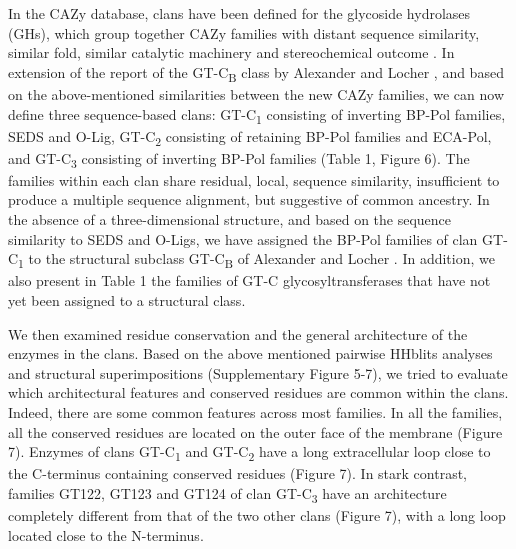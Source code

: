 \documentclass{article}
\begin{document}
In the CAZy database, clans have been defined for the glycoside hydrolases (GHs), which group together CAZy families with distant sequence similarity, similar fold, similar catalytic machinery and stereochemical outcome \cite{henrissat_updating_1996}. In extension of the report of the GT-C\textsubscript{B} class by Alexander and Locher \cite{alexander_emerging_2023}, and based on the above-mentioned similarities between the new CAZy families, we can now define three sequence-based clans: GT-C\textsubscript{1} consisting of inverting BP-Pol families, SEDS and O-Lig, GT-C\textsubscript{2} consisting of retaining BP-Pol families and ECA-Pol, and GT-C\textsubscript{3} consisting of inverting BP-Pol families (Table 1, Figure 6). The families within each clan share residual, local, sequence similarity, insufficient to produce a multiple sequence alignment, but suggestive of common ancestry. In the absence of a three-dimensional structure, and based on the sequence similarity to SEDS and O-Ligs, we have assigned the BP-Pol families of clan GT-C\textsubscript{1} to the structural subclass GT-C\textsubscript{B}  of Alexander and Locher \cite{alexander_emerging_2023}. In addition, we also present in Table 1 the families of GT-C glycosyltransferases that have not yet been assigned to a structural class.

We then examined residue conservation and the general architecture of the enzymes in the clans. Based on the above mentioned pairwise HHblits analyses and structural superimpositions (Supplementary Figure 5-7), we tried to evaluate which architectural features and conserved residues are common within the clans. Indeed, there are some common features across most families. In all the families, all the conserved residues are located on the outer face of the membrane (Figure 7). Enzymes of clans GT-C\textsubscript{1} and GT-C\textsubscript{2} have a long extracellular loop close to the C-terminus containing conserved residues (Figure 7). In stark contrast, families GT122, GT123 and GT124 of clan GT-C\textsubscript{3} have an architecture completely different from that of the two other clans (Figure 7), with a long loop located close to the N-terminus. 
\end{document}
